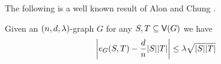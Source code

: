 \documentclass[11pt]{article}
\begin{document}
The following is a well known result of Alon and Chung \cite{alon88mixing}.

\begin{lemma}\label{lemma:expanders-mixing-lemma}
  Given an $\EnDeeLambda$-graph $G$ for any $S, T \subseteq \Vertices{G}$ we have
$$
  \left| \CutEdges{S}{T}{G} - \frac{d}{n}|S||T| \right|
  \le \lambda\sqrt{\Size{S}\Size{T} }
$$
\end{lemma}



  

\end{document}
